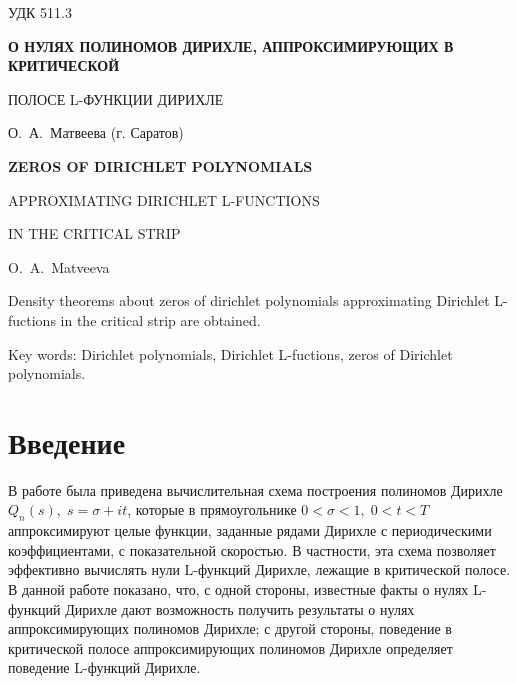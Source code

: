 

\thispagestyle{empty}



\setcounter{equation}{0}

\setcounter{theorem}{0}

\setcounter{lemm}{0}

\setcounter{corollary}{0}

\setcounter{footnote}{0}

\setcounter{section}{0}
УДК 511.3
\begin{center}
{\Large \bf О НУЛЯХ ПОЛИНОМОВ ДИРИХЛЕ, АППРОКСИМИРУЮЩИХ В КРИТИЧЕСКОЙ

\medskip
ПОЛОСЕ L-ФУНКЦИИ ДИРИХЛЕ}

\medskip
{\large О.~А.~Матвеева (г. Саратов)}
\end{center}

\newpage

\begin{abstract}
Получены плотностные теоремы о нулях полиномов Дирихле,
аппроксимирующих L-функции Дирихле в критической области.

\medskip
Ключевые слова: полиномы Дирихле, L-функции Дирихле, нули полиномов
Дирихле.
\end{abstract}
\begin{center}
{\Large \bf ZEROS OF DIRICHLET POLYNOMIALS

\medskip
APPROXIMATING DIRICHLET L-FUNCTIONS

\medskip
IN THE CRITICAL STRIP}

\medskip
{\large O.~A.~Matveeva}
\end{center}

\begin{engabstract}
Density theorems about zeros of dirichlet polynomials approximating
Dirichlet L-fuctions in the critical strip are obtained.

\medskip
Key words: Dirichlet polynomials, Dirichlet L-fuctions, zeros of
Dirichlet polynomials.
\end{engabstract}

\section{Введение}
В работе \cite{KorotkovMatveeva} была приведена вычислительная схема
построения полиномов Дирихле  $Q_n(s),\; s = \sigma + it$, которые
в прямоугольнике $0 < \sigma < 1,\; 0 < t < T$ аппроксимируют целые
функции, заданные рядами Дирихле с периодическими коэффициентами,
с показательной скоростью. В частности, эта схема позволяет
эффективно вычислять нули L-функций Дирихле, лежащие в
критической полосе. В данной работе показано, что, с одной стороны,
известные факты о нулях L-функций Дирихле дают возможность получить
результаты о нулях аппроксимирующих полиномов Дирихле; с другой
стороны, поведение в критической полосе аппроксимирующих полиномов
Дирихле определяет поведение L-функций Дирихле.

